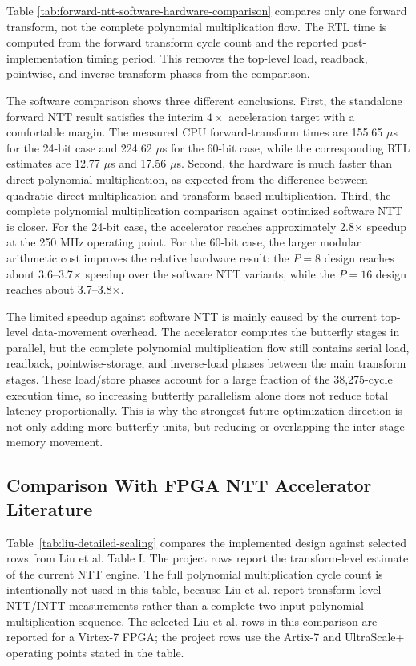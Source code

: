 \documentclass[a4paper, 12pt, titlepage]{article}
\begin{document}
Table \ref{tab:forward-ntt-software-hardware-comparison} compares only one
forward transform, not the complete polynomial multiplication flow. The RTL
time is computed from the forward transform cycle count and the reported
post-implementation timing period. This removes the top-level load, readback,
pointwise, and inverse-transform phases from the comparison.

The software comparison shows three different conclusions. First, the standalone
forward NTT result satisfies the interim \(4\times\) acceleration target with a
comfortable margin. The measured CPU forward-transform times are 155.65
\(\mu\)s for the 24-bit case and 224.62 \(\mu\)s for the 60-bit case, while the
corresponding RTL estimates are 12.77 \(\mu\)s and 17.56 \(\mu\)s. Second, the
hardware is much faster than direct polynomial multiplication, as expected from
the difference between quadratic direct multiplication and transform-based
multiplication. Third, the complete polynomial multiplication comparison against
optimized software NTT is closer. For the 24-bit case, the accelerator reaches
approximately 2.8$\times$ speedup at the 250 MHz operating point. For the 60-bit
case, the larger modular arithmetic cost improves the relative hardware result:
the $P=8$ design reaches about 3.6--3.7$\times$ speedup over the software NTT
variants, while the $P=16$ design reaches about 3.7--3.8$\times$.

The limited speedup against software NTT is mainly caused by the current
top-level data-movement overhead. The accelerator computes the butterfly stages
in parallel, but the complete polynomial multiplication flow still contains
serial load, readback, pointwise-storage, and inverse-load phases between the
main transform stages. These load/store phases account for a large fraction of
the 38,275-cycle execution time, so increasing butterfly parallelism alone does
not reduce total latency proportionally. This is why the strongest future
optimization direction is not only adding more butterfly units, but reducing or
overlapping the inter-stage memory movement.

\subsection{Comparison With FPGA NTT Accelerator Literature}

Table~\ref{tab:liu-detailed-scaling} compares the implemented design against
selected rows from Liu et al. Table I. The project rows report the
transform-level estimate of the current NTT engine. The full polynomial
multiplication cycle count is intentionally not used in this table, because Liu
et al. report transform-level NTT/INTT measurements rather than a complete
two-input polynomial multiplication sequence. The selected Liu et al. rows in
this comparison are reported for a Virtex-7 FPGA; the project rows use the
Artix-7 and UltraScale+ operating points stated in the table.
\end{document}
